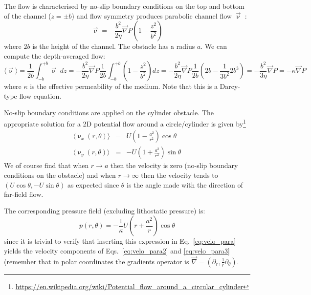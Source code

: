 The flow is characterised by no-slip boundary conditions on the top and bottom of the channel ($z=\pm b$) and flow symmetry produces parabolic channel flow $\vec\upnu$ :
\begin{equation}
\vec\upnu = -\frac{b^2}{2\eta} \vec\nabla P \left( 1 - \frac{z^2}{b^2} \right)
\end{equation}
where $2b$ is the height of the channel. The obstacle has a radius $a$. We can compute the depth-averaged flow:
\begin{equation}
\langle \vec\upnu \rangle = \frac{1}{2b} \int_{-b}^{+b} \vec\upnu \; dz 
=-\frac{b^2}{2\eta} \vec\nabla P \frac{1}{2b} 
\int_{-b}^{+b}   \left( 1 - \frac{z^2}{b^2} \right) dz
= -\frac{b^2}{2\eta} \vec\nabla P \frac{1}{2b} 
\left( 2b - \frac{1}{3b^2} 2b^3 \right)
= - \frac{b^2}{3\eta} \vec\nabla P 
= -\kappa \vec\nabla P
\label{eq:velo_para}
\end{equation}
where $\kappa$ is the effective permeability of the medium. Note that this is a Darcy-type flow equation.


No-slip boundary conditions are applied on the cylinder obstacle.
The appropriate solution for a 2D potential flow around a circle/cylinder is given by\footnote{\url{https://en.wikipedia.org/wiki/Potential_flow_around_a_circular_cylinder}}
\begin{eqnarray}
\langle\upnu_x(r,\theta)\rangle &=& U \left(1 -\frac{a^2}{r^2} \right) \cos \theta \label{eq:velo_para2}\\
\langle\upnu_y(r,\theta)\rangle &=& -U \left(1 +\frac{a^2}{r^2} \right) \sin \theta \label{eq:velo_para3}
\end{eqnarray}
We of course find that when $r\rightarrow a$ then the velocity is zero (no-slip boundary conditions on the obstacle) and when $r\rightarrow \infty$ then the velocity tends to 
$(U \cos\theta, -U \sin\theta)$ as expected since $\theta$ is the angle made with the direction of far-field flow. 

The corresponding pressure field (excluding lithostatic pressure) is: 
\[
p(r,\theta) = -\frac{1}{\kappa} U \left( r  + \frac{a^2}{r}  \right)\cos \theta
\]
since it is trivial to verify that inserting this expression in Eq.~\eqref{eq:velo_para} yields the velocity components of Eqs.~\eqref{eq:velo_para2} and \eqref{eq:velo_para3} (remember that in polar coordinates the gradients operator is $\vec\nabla=(\partial_r , \frac{1}{r} \partial_\theta)$.

